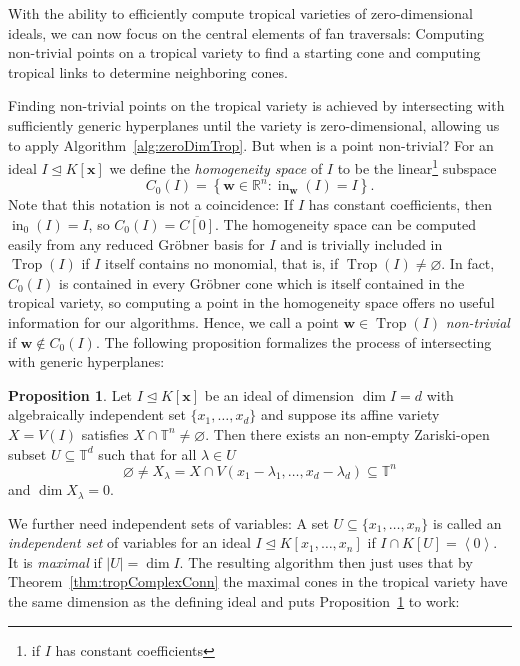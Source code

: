 \documentclass[
  paper=a4,
  titlepage,
  bibliography=totoc,
  pagesize=pdftex
]{scrartcl}
\numberwithin{figure}{section}
\numberwithin{equation}{section}
\numberwithin{table}{section}
\newcommand*\setR{\mathds{R}}
\newcommand*\setT{\mathds{T}}
\newcommand*\ideal[1]{\left\langle #1 \right\rangle}
\let\vec\mathbf
\let\idealof\trianglelefteq
\DeclareMathOperator{\Trop}{Trop}
\DeclareMathOperator{\initial}{in}
\theoremstyle{definition}
\newtheorem{proposition}[definition]{Proposition}
\numberwithin{definition}{section}
\begin{document}
With the ability to efficiently compute tropical varieties of zero-dimensional ideals, we
can now focus on the central elements of fan traversals: Computing non-trivial points on a
tropical variety to find a starting cone and computing tropical links to determine
neighboring cones.

Finding non-trivial points on the tropical variety is achieved by intersecting with
sufficiently generic hyperplanes until the variety is zero-dimensional, allowing us to
apply Algorithm~\ref{alg:zeroDimTrop}. But when is a point non-trivial? For an ideal $I
\idealof K[\vec x]$ we define the \emph{homogeneity space} of $I$ to be the
linear\footnote{if $I$ has constant coefficients} subspace
\[
  C_0(I) = \left\{ \vec w \in \setR^n : \initial_{\vec w}(I) = I \right\}.
\]
Note that this notation is not a coincidence: If $I$ has constant coefficients, then
$\initial_0(I) = I$, so $C_0(I) = \overline{C[0]}$. The homogeneity space can be computed
easily from any reduced Gröbner basis for $I$ and is trivially included in $\Trop(I)$ if
$I$ itself contains no monomial, that is, if $\Trop(I) \neq \varnothing$. In fact,
$C_0(I)$ is contained in every Gröbner cone which is itself contained in the tropical
variety, so computing a point in the homogeneity space offers no useful information for
our algorithms. Hence, we call a point $\vec w \in \Trop(I)$ \emph{non-trivial} if $\vec w
\not\in C_0(I)$. The following proposition formalizes the process of intersecting with
generic hyperplanes:

\begin{proposition}
  Let $I \idealof K[\vec x]$ be an ideal of dimension $\dim I = d$ with algebraically
  independent set $\{x_1, \dots, x_d\}$ and suppose its affine variety $X = V(I)$
  satisfies $X \cap \setT^n \neq \varnothing$. Then there exists an non-empty Zariski-open
  subset $U \subseteq \setT^d$ such that for all $\lambda \in U$
  \[
    \varnothing \neq X_\lambda =
    X \cap V(x_1-\lambda_1, \dots, x_d - \lambda_d) \subseteq \setT^n
  \]
  and $\dim X_\lambda = 0$.
  \label{prp:intersHyperp}
\end{proposition}

We further need independent sets of variables: A set $U \subseteq \{ x_1, \dots, x_n \}$
is called an \emph{independent set} of variables for an ideal $I \idealof K[x_1, \dots,
x_n]$ if $I \cap K[U] = \ideal0$. It is \emph{maximal} if $|U| = \dim I$. The resulting
algorithm then just uses that by Theorem~\ref{thm:tropComplexConn} the maximal cones in
the tropical variety have the same dimension as the defining ideal and puts
Proposition~\ref{prp:intersHyperp} to work:
\end{document}
